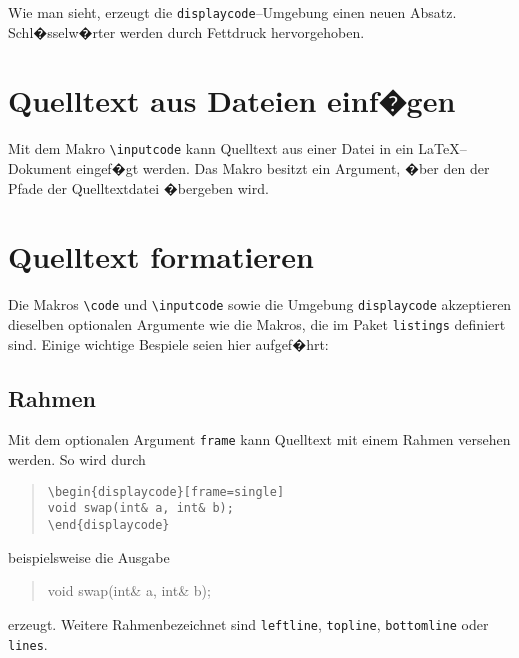 \noindent
Wie man sieht, erzeugt die \verb|displaycode|--Umgebung einen neuen Absatz. Schl�sselw�rter werden durch Fettdruck hervorgehoben.



\section{Quelltext aus Dateien einf�gen}

Mit dem Makro \verb|\inputcode| kann Quelltext aus einer Datei in ein \LaTeX--Dokument eingef�gt werden. Das Makro besitzt ein Argument, �ber den der Pfade der Quelltextdatei �bergeben wird.



\section{Quelltext formatieren}

Die Makros \verb|\code| und \verb|\inputcode| sowie die Umgebung \verb|displaycode| akzeptieren dieselben optionalen Argumente wie die Makros, die im Paket \verb|listings| definiert sind. Einige wichtige Bespiele seien hier aufgef�hrt:


\subsection{Rahmen}

Mit dem optionalen Argument \verb|frame| kann Quelltext mit einem Rahmen versehen werden. So wird durch

\begin{quote}
\begin{verbatim}
\begin{displaycode}[frame=single]
void swap(int& a, int& b);
\end{displaycode}
\end{verbatim}
\end{quote}

\noindent
beispielsweise die Ausgabe

\begin{quote}
\begin{displaycode}[frame=single]
void swap(int& a, int& b);
\end{displaycode}
\end{quote}

\noindent
erzeugt. Weitere Rahmenbezeichnet sind \verb|leftline|, \verb|topline|, \verb|bottomline| oder \verb|lines|.



